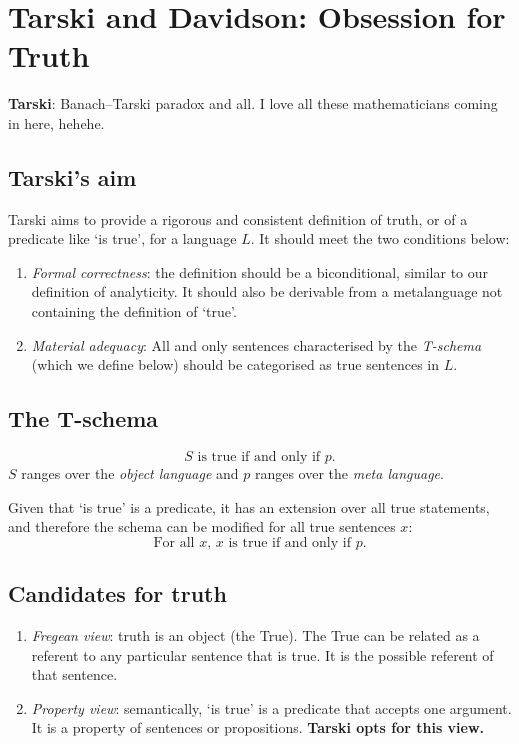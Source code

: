 \chapter{Tarski and Davidson: Obsession for Truth}

\textbf{Tarski}: Banach--Tarski paradox and all. I love all these mathematicians coming in here, hehehe.

\section{Tarski's aim}

Tarski aims to provide a rigorous and consistent definition of truth, or of a predicate like `is true', for a language $L$. It should meet the two conditions below:
\begin{enumerate}[label=(\alph*)]
  \item \emph{Formal correctness}: the definition should be a biconditional, similar to our definition of analyticity. It should also be derivable from a metalanguage not containing the definition of `true'.
  \item \emph{Material adequacy}: All and only sentences characterised by the \emph{T-schema} (which we define below) should be categorised as true sentences in $L$.
\end{enumerate}

\section{The T-schema}

\begin{definition}[T-schema]
\[
  \text{$S$ is true if and only if $p$.}
\]
$S$ ranges over the \emph{object language} and $p$ ranges over the \emph{meta language}.
\end{definition}

Given that `is true' is a predicate, it has an extension over all true statements, and therefore the schema can be modified for all true sentences $x$:
\[
  \text{For all $x$, $x$ is true if and only if $p$.}
\]

\section{Candidates for truth}

\begin{enumerate}[label=(\alph*)]
  \item \emph{Fregean view}: truth is an object (the True). The True can be related as a referent to any particular sentence that is true. It is the possible referent of that sentence.
  \item \emph{Property view}: semantically, `is true' is a predicate that accepts one argument. It is a property of sentences or propositions. \textbf{Tarski opts for this view.}
\end{enumerate}

